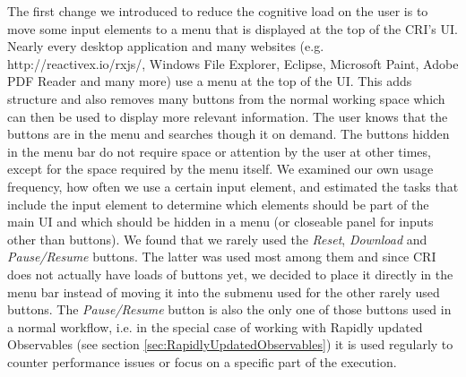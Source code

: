 The first change we introduced to reduce the cognitive load on the user is to move some input elements to a menu that is displayed at the top of the CRI's UI. Nearly every desktop application and many websites (e.g. http://reactivex.io/rxjs/, Windows File Explorer, Eclipse, Microsoft Paint, Adobe PDF Reader and many more) use a menu at the top of the UI. This adds structure and also removes many buttons from the normal working space which can then be used to display more relevant information. The user knows that the buttons are in the menu and searches though it on demand. The buttons hidden in the menu bar do not require space or attention by the user at other times, except for the space required by the menu itself. We examined our own usage frequency, how often we use a certain input element, and estimated the tasks that include the input element to determine which elements should be part of the main UI and which should be hidden in a menu (or closeable panel for inputs other than buttons). We found that we rarely used the \emph{Reset}, \emph{Download} and \emph{Pause/Resume} buttons. The latter was used most among them and since CRI does not actually have loads of buttons yet, we decided to place it directly in the menu bar instead of moving it into the submenu used for the other rarely used buttons. The \emph{Pause/Resume} button is also the only one of those buttons used in a normal workflow, i.e. in the special case of working with Rapidly updated Observables (see section \ref{sec:RapidlyUpdatedObservables}) it is used regularly to counter performance issues or focus on a specific part of the execution.
